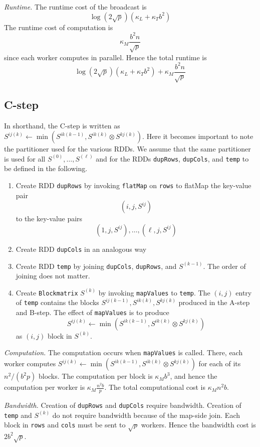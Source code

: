\documentclass{article} %
\begin{document}
\emph{Runtime.} The runtime cost of the broadcast is
\[
\log(2\sqrt{p})(\kappa_L + \kappa_T b^2)
\]
The runtime cost of computation is
\[
\kappa_M \frac{b^2 n}{\sqrt{p}}
\]
since each worker computes in parallel.
Hence the total runtime is
\[
\log(2\sqrt{p})(\kappa_L + \kappa_T b^2) + \kappa_M \frac{b^2 n}{\sqrt{p}}
\]

\subsection{C-step}

In shorthand, the C-step is written as $S^{ij(k)} \leftarrow \min(S^{ik(k-1)}, S^{ik(k)} \otimes S^{kj(k)})$.
Here it becomes important to note the partitioner used for the various RDDs.
We assume that the same partitioner is used for all $S^{(0)}, \hdots, S^{(\ell)}$
and for the RDDs {\tt dupRows}, {\tt dupCols}, and {\tt temp} to be defined in the following.

\begin{enumerate}
\item Create RDD {\tt dupRows} by invoking {\tt flatMap} on {\tt rows} to flatMap the key-value pair
\[
(i, j, S^{ij})
\]
to the key-value pairs
\[
(1, j, S^{ij}), \hdots, (\ell, j, S^{ij})
\]
\item Create RDD {\tt dupCols} in an analogous way
\item Create RDD {\tt temp} by joining {\tt dupCols}, {\tt dupRows},
  and $S^{(k-1)}$.  The order of joining does not matter.
\item Create {\tt Blockmatrix} $S^{(k)}$ by invoking {\tt mapValues}
  to {\tt temp}.  The $(i, j)$ entry of {\tt temp} contains the blocks
  $S^{ij(k-1)}, S^{ik(k)}, S^{kj(k)}$ produced in the A-step and
  B-step.  The effect of {\tt mapValues} is to produce
\[
S^{ij(k)} \leftarrow \min(S^{ik(k-1)}, S^{ik(k)} \otimes S^{kj(k)})
\]
as $(i, j)$ block in $S^{(k)}$.
\end{enumerate}

\emph{Computation.}  The computation occurs when {\tt mapValues} is
called.  There, each worker computes $S^{ij(k)} \leftarrow
\min(S^{ik(k-1)}, S^{ik(k)} \otimes S^{kj(k)})$ for each of its
$n^2/(b^2 p)$ blocks.  The computation per block is $\kappa_M b^3$, and
hence the computation per worker is $\kappa_M \frac{n^2b}{p}$.
The total computational cost is $\kappa_M n^2b$.

\emph{Bandwidth.} Creation of {\tt dupRows} and {\tt dupCols} require
bandwidth.  Creation of {\tt temp} and $S^{(k)}$ do not require
bandwidth because of the map-side join.  Each block in {\tt rows} and
{\tt cols} must be sent to $\sqrt{p}$ workers.
Hence the bandwidth cost is $2 b^2 \sqrt{p}$.
\end{document}
